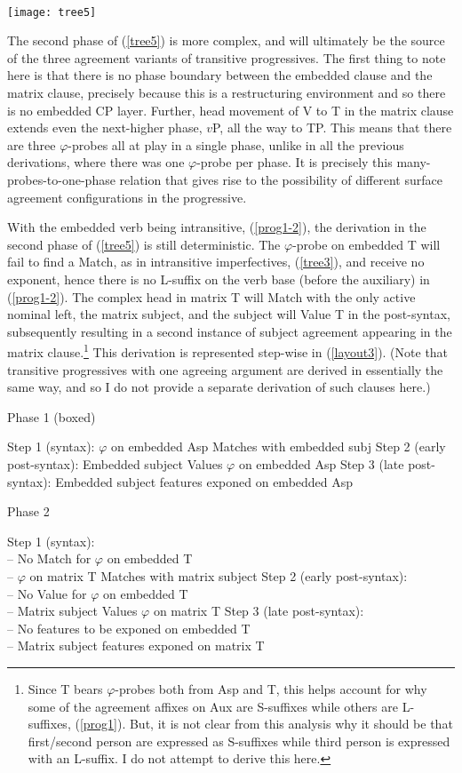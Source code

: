 \documentclass[output=paper
,modfonts
,nonflat]{langsci/langscibook}
\begin{document}
\ea \label{tree5} \- \\ \texttt{[image: tree5]}
\z

\noindent The second phase of (\ref{tree5}) is more complex, and will ultimately be the source of the three agreement variants of transitive progressives. The first thing to note here is that there is no phase boundary between the embedded clause and the matrix clause, precisely because this is a restructuring environment and so there is no embedded CP layer. Further, head movement of V to T in the matrix clause extends even the next-higher phase, $v$P, all the way to TP. This means that there are three $\varphi$-probes all at play in a single phase, unlike in all the previous derivations, where there was one $\varphi$-probe per phase. It is precisely this many-probes-to-one-phase relation that gives rise to the possibility of different surface agreement configurations in the progressive.

With the embedded verb being intransitive, (\ref{prog1-2}), the derivation in the second phase of (\ref{tree5}) is still deterministic. The $\varphi$-probe on embedded T will fail to find a Match, as in intransitive imperfectives, (\ref{tree3}), and receive no exponent, hence there is no L-suffix on the verb base (before the auxiliary) in (\ref{prog1-2}). The complex head in matrix T will Match with the only active nominal left, the matrix subject, and the subject will Value T in the post-syntax, subsequently resulting in a second instance of subject agreement appearing in the matrix clause.\footnote{Since T bears $\varphi$-probes both from Asp and T, this helps account for why some of the agreement affixes on Aux are S-suffixes while others are L-suffixes, (\ref{prog1}). But, it is not clear from this analysis why it should be that first/second  person are expressed as S-suffixes while third person is expressed with an L-suffix. I do not attempt to derive this here.} This derivation is represented step-wise in (\ref{layout3}). (Note that transitive progressives with one agreeing argument are derived in essentially the same way, and so I do not provide a separate derivation of such clauses here.)

\eal \label{layout3}
\ex Phase 1 (boxed)
\begin{xlist}
\ex Step 1 (syntax): $\varphi$ on embedded Asp Matches with embedded subj
\ex Step 2 (early post-syntax): Embedded subject Values $\varphi$ on embedded Asp
\ex Step 3 (late post-syntax): Embedded subject features exponed on embedded Asp
\end{xlist}
\ex Phase 2
\begin{xlist}
\ex Step 1 (syntax):\\-- No Match for $\varphi$ on embedded T\\-- $\varphi$ on matrix T Matches with matrix subject
\ex Step 2 (early post-syntax):\\-- No Value for $\varphi$ on embedded T\\-- Matrix subject Values $\varphi$ on matrix T
\ex Step 3 (late post-syntax):\\-- No features to be exponed on embedded T\\-- Matrix subject features exponed on matrix T
\end{xlist}
\zl
\end{document}
